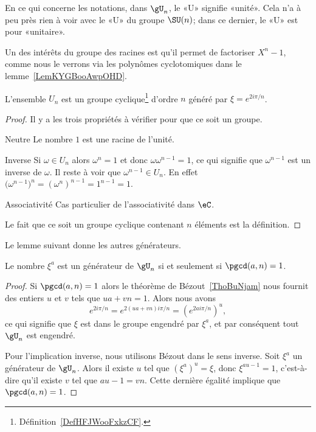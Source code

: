 \begin{normaltext}
    En ce qui concerne les notations, dans \( \gU_n\), le «U» signifie «unité». Cela n'a à peu près rien à voir avec le «U» du groupe \( \SU(n)\); dans ce dernier, le «U» est pour «unitaire».
\end{normaltext}

Un des intérêts du groupe des racines est qu'il permet de factoriser \( X^n-1\), comme nous le verrons via les polynômes cyclotomiques dans le lemme~\ref{LemKYGBooAwpOHD}.

\begin{lemma}       \label{LemWHQGooXyeJiw}
    L'ensemble \( U_n\) est un groupe cyclique\footnote{Définition~\ref{DefHFJWooFxkzCF}.} d'ordre \( n\) généré par \( \xi= e^{2i\pi/n}\).
\end{lemma}

\begin{proof}
    Il y a les trois propriétés à vérifier pour que ce soit un groupe.
    \begin{subproof}
        \item[Neutre]
            Le nombre \( 1\) est une racine de l'unité.
    \item[Inverse]
        Si \( \omega\in U_n\) alors \( \omega^n=1\) et donc \( \omega\omega^{n-1}=1\), ce qui signifie que \( \omega^{n-1}\) est un inverse de \( \omega\). Il reste à voir que \( \omega^{n-1}\in U_n\). En effet \(  \big( \omega^{n-1} \big)^n=(\omega^n)^{n-1}=1^{n-1}=1  \).
    \item[Associativité]
        Cas particulier de l'associativité dans \( \eC\).
    \end{subproof}
    Le fait que ce soit un groupe cyclique contenant \( n\) éléments est la définition.
\end{proof}


Le lemme suivant donne les autres générateurs.
\begin{lemma}   \label{LemcFTNMa}
    Le nombre \( \xi^a\) est un générateur de \( \gU_n\) si et seulement si \( \pgcd(a,n)=1\).
\end{lemma}

\begin{proof}
    Si \( \pgcd(a,n)=1\) alors le théorème de Bézout~\ref{ThoBuNjam} nous fournit des entiers \( u\) et \( v\) tels que \( ua+vn=1\). Alors nous avons
    \begin{equation}
        e^{2i\pi /n}= e^{2(ua+vn)i\pi/n}=( e^{2ai\pi/n})^u,
    \end{equation}
    ce qui signifie que \( \xi\) est dans le groupe engendré par \( \xi^a\), et par conséquent tout \( \gU_n\) est engendré.

    Pour l'implication inverse, nous utilisons Bézout dans le sens inverse. Soit \( \xi^a\) un générateur de \( \gU_n\). Alors il existe \( u\) tel que \( (\xi^a)^u=\xi\), donc \( \xi^{au-1}=1\), c'est-à-dire qu'il existe \( v\) tel que \( au-1=vn\). Cette dernière égalité implique que \( \pgcd(a,n)=1\).
\end{proof}


